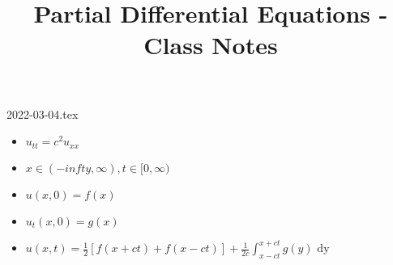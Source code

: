 \documentclass{article}
\title{Partial Differential Equations - Class Notes} %
\begin{document}
\maketitle
\newpage

{2022-03-04.tex}

%
\begin{itemize}
  \item $u_{tt} = c^2 u_{xx}$
  \item $x \in (- infty, \infty), t \in [0, \infty)$
  \item $u(x, 0) = f(x)$
  \item $u_t(x, 0) = g(x)$
  \item $\displaystyle u(x, t) = \frac{1}{2} \left[ f(x + ct) + f(x - ct) \right] + \frac{1}{2c} \int^{x + ct}_{x - ct} g(y) \text{ dy}$
\end{itemize}
%
\end{document}
